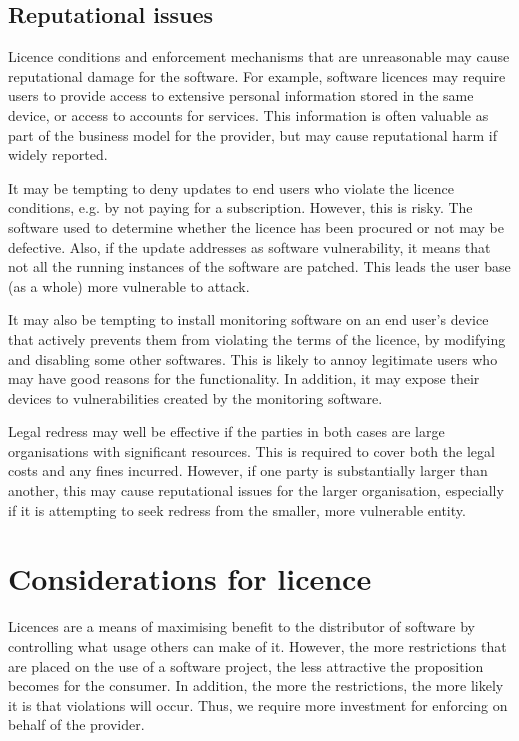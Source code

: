 \documentclass[a4paper, openany]{memoir}
\begin{document}
\subsection{Reputational issues}
Licence conditions and enforcement mechanisms that are unreasonable may cause reputational damage for the software. For example, software licences may require users to provide access to extensive personal information stored in the same device, or access to accounts for services. This information is often valuable as part of the business model for the provider, but may cause reputational harm if widely reported.

It may be tempting to deny updates to end users who violate the licence conditions, e.g. by not paying for a subscription. However, this is risky. The software used to determine whether the licence has been procured or not may be defective. Also, if the update addresses as software vulnerability, it means that not all the running instances of the software are patched. This leads the user base (as a whole) more vulnerable to attack.

It may also be tempting to install monitoring software on an end user's device that actively prevents them from violating the terms of the licence, by modifying and disabling some other softwares. This is likely to annoy legitimate users who may have good reasons for the functionality. In addition, it may expose their devices to vulnerabilities created by the monitoring software.

Legal redress may well be effective if the parties in both cases are large organisations with significant resources. This is required to cover both the legal costs and any fines incurred. However, if one party is substantially larger than another, this may cause reputational issues for the larger organisation, especially if it is attempting to seek redress from the smaller, more vulnerable entity.

\section{Considerations for licence}
Licences are a means of maximising benefit to the distributor of software by controlling what usage others can make of it. However, the more restrictions that are placed on the use of a software project, the less attractive the proposition becomes for the consumer. In addition, the more the restrictions, the more likely it is that violations will occur. Thus, we require more investment for enforcing on behalf of the provider.
\end{document}
